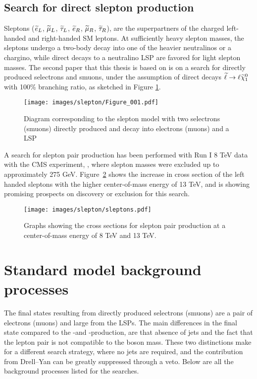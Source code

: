 \subsection*{Search for direct slepton production}\label{sec:searchSlepton}
\noindent\justify
Sleptons ($\widetilde{e}_{L}$, $\widetilde{\mu}_{L}$, $\widetilde{\tau}_{L}$, $\widetilde{e}_{R}$, $\widetilde{\mu}_{R}$, $\widetilde{\tau}_{R}$), are the superpartners of the charged left-handed and right-handed SM leptons. 
At sufficiently heavy slepton masses, the sleptons undergo a two-body decay into one of the heavier neutralinos or a chargino, while direct decays to a neutralino LSP are favored for light slepton masses.
The second paper that this thesis is based on is on a search for directly produced selectrons and smuons, under the assumption of direct decays $\widetilde{\ell}\to \ell\widetilde{\chi}^{0}_{1}$ with 100\% branching ratio, as sketched in Figure \ref{fig:feynmanSlepton}.
\begin{figure}[!htp]
\centering
\texttt{[image: images/slepton/Figure\_001.pdf]}
\caption{Diagram corresponding to the slepton model with two selectrons (smuons) directly produced and decay into electrons (muons) and a LSP} 
\label{fig:feynmanSlepton}
\end{figure}                                                                                                                                           
A search for slepton pair production has been performed with Run I 8 TeV data with the CMS experiment, \cite{slepton8TeV}, where slepton masses were excluded up to approximately 275 GeV. 
Figure~\ref{sig:xsec} shows the increase in cross section of the left handed sleptons with the higher center-of-mass energy of 13 TeV, and is showing promising prospects on discovery or exclusion for this search.
\begin{figure}[!h]
\centering
\texttt{[image: images/slepton/sleptons.pdf]}
\caption{Graphs showing the cross sections for slepton pair production at a center-of-mass energy of 8 TeV and 13 TeV.}
\label{sig:xsec}
\end{figure}
\section{Standard model background processes}
\noindent\justify
The final states resulting from directly produced selectrons (smuons) are a pair of electrons (muons) and large \ptmiss from the LSPs. 
The main differences in the final state compared to the \firstcharg-\secondchi and \firstchi-\firstchi production, are that absence of jets and the fact that the lepton pair is not compatible to the \PZ boson mass. 
These two distinctions make for a different search strategy, where no jets are required, and the contribution from Drell--Yan can be greatly suppressed through a veto. 
Below are all the background processes listed for the searches. 
